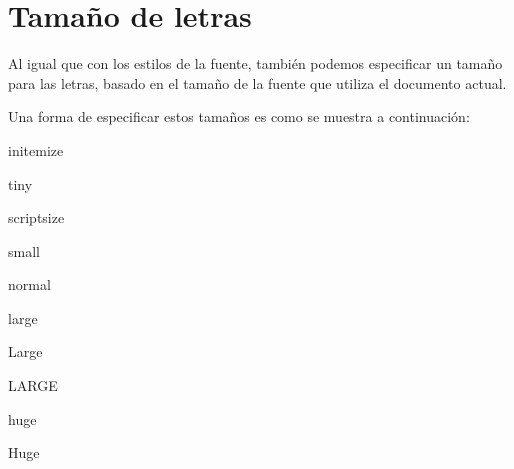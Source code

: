\documentclass[letterpaper,11pt]{article}
\begin{document}
\section{Tamaño de letras}

Al igual que con los estilos de la fuente, también podemos especificar un tamaño para las letras, basado en el tamaño de la fuente que utiliza el documento actual.

Una forma de especificar estos tamaños es como se muestra a continuación:

\begin{•}in{itemize}

\item {\tiny tiny}

\item {\scriptsize scriptsize}

\item {\small small}

\item {\normalsize normal}

\item {\large large}

\item {\Large Large}

\item {\LARGE LARGE}

\item {\huge huge}

\item {\Huge Huge}


\end{•}
\end{document}
